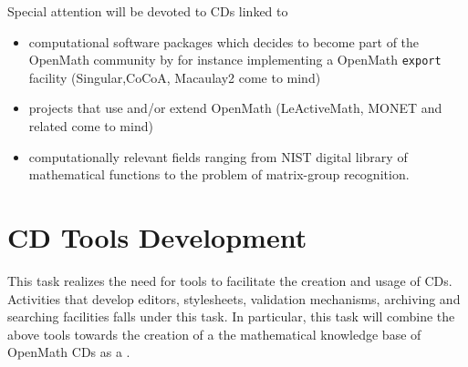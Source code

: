 \documentclass{euproposal}
\begin{document}
Special attention will be devoted to CDs linked to 
\begin{itemize}
\item computational software packages which decides to become part of the
OpenMath community by for instance implementing a OpenMath
\texttt{export} facility (Singular,CoCoA, Macaulay2 come to mind)

\item projects that use and/or extend OpenMath (LeActiveMath, MONET
  and related come to mind)
  
\item computationally relevant fields ranging from NIST digital
  library of mathematical functions to the problem of matrix-group
  recognition.
\end{itemize}


\section{CD Tools Development} 
\label{tools}
This task realizes the need for tools to facilitate the creation and
usage of CDs. Activities that develop editors, stylesheets, validation
mechanisms, archiving and searching facilities falls under this task.
In particular, this task will combine the above tools towards the
creation of a the mathematical knowledge base of OpenMath CDs as a .
\end{document}
